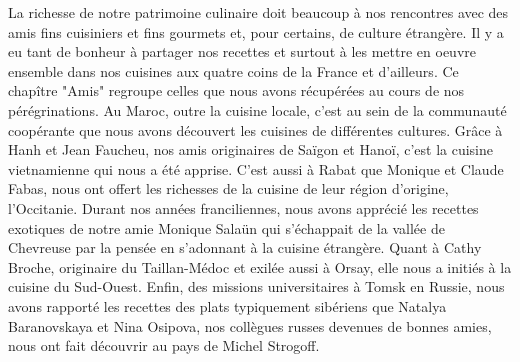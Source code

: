 La richesse de notre patrimoine culinaire doit beaucoup à nos rencontres avec des amis fins cuisiniers et fins gourmets et, pour certains, de culture étrangère. Il y a eu tant de bonheur à partager nos recettes et surtout à les mettre en oeuvre ensemble dans nos cuisines aux quatre coins de la France et d'ailleurs. Ce chapître "Amis" regroupe celles que nous avons récupérées au cours de nos pérégrinations. Au Maroc, outre la cuisine locale, c'est au sein de la communauté coopérante que nous avons découvert les cuisines de différentes cultures. Grâce à Hanh et Jean Faucheu, nos amis originaires de Saïgon et Hanoï, c'est la cuisine vietnamienne qui nous a été apprise. C'est aussi à Rabat que Monique et Claude Fabas, nous ont offert les richesses de la cuisine de leur région d'origine, l'Occitanie. Durant nos années franciliennes, nous avons apprécié les recettes exotiques de notre amie Monique Salaün qui s'échappait de la vallée de Chevreuse par la pensée en s'adonnant à la cuisine étrangère. Quant à Cathy Broche, originaire du Taillan-Médoc et exilée aussi à Orsay, elle nous a initiés à la cuisine du Sud-Ouest. Enfin, des missions universitaires à Tomsk en Russie, nous avons rapporté les recettes des plats typiquement sibériens que Natalya Baranovskaya et Nina Osipova, nos collègues russes devenues de bonnes amies, nous ont fait découvrir au pays de Michel Strogoff.   